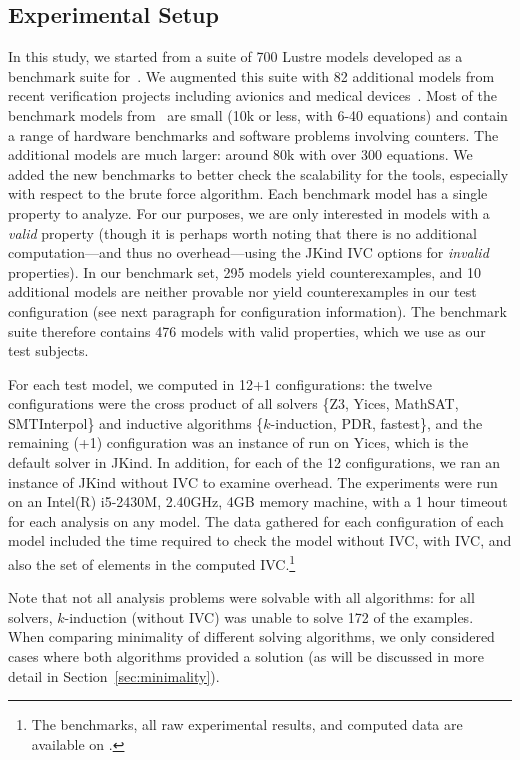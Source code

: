 \subsection{Experimental Setup}
In this study, we started from a suite of 700 Lustre models developed
as a benchmark suite for~\cite{Hagen08:FMCAD}. We augmented this suite
with 82 additional models from recent verification projects including
avionics and medical devices~\cite{QFCS15:backes,hilt2013}. Most of
the benchmark models from~\cite{Hagen08:FMCAD} are small (10k or less,
with 6-40 equations) and contain a range of hardware benchmarks and
software problems involving counters. The additional models are much
larger: around 80k with over 300 equations. We added the new
benchmarks to better check the scalability for the tools, especially
with respect to the brute force algorithm.
%
Each benchmark model has a single property to analyze.  For our purposes, we are only interested in models with a {\em valid} property (though it is perhaps worth noting that there is no additional computation---and thus no overhead---using the JKind IVC options for {\em invalid} properties).  In our benchmark set, 295 models yield counterexamples, and 10 additional models are neither provable nor yield counterexamples in our test configuration (see next paragraph for configuration information).  The benchmark suite therefore contains 476 models with valid properties, which we use as our test subjects.

For each test model, we computed \ucalg in 12+1 configurations: the
twelve configurations were the cross product of all solvers \{Z3,
Yices, MathSAT, SMTInterpol\} and inductive algorithms
\{$k$-induction, PDR, fastest\}, and the remaining (+1) configuration
was an instance of \bfalg run on Yices, which is the default solver in
JKind. In addition, for each of the 12 configurations, we ran an
instance of JKind without IVC to examine overhead. The experiments
were run on an Intel(R) i5-2430M, 2.40GHz, 4GB memory machine, with a
1 hour timeout for each analysis on any model. The data gathered for
each configuration of each model included the time required to check
the model without IVC, with IVC, and also the set of elements in the
computed IVC.\footnote{The benchmarks, all raw experimental results,
  and computed data are available on \cite{expr}.}

Note that not all analysis problems were solvable with all algorithms: for all solvers, $k$-induction (without IVC) was unable to solve 172 of the examples.  When comparing minimality of different solving algorithms, we only considered cases where both algorithms provided a solution (as will be discussed in more detail in Section~\ref{sec:minimality}).

